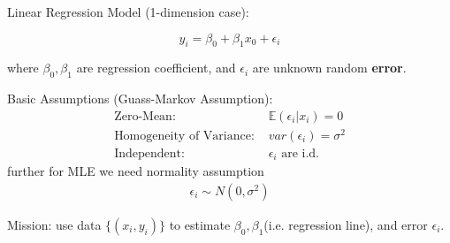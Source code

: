 \begin{point}
    Linear Regression Model (1-dimension case):
\end{point}

    \begin{equation}
        y_i=\beta_0+\beta_1x_0+\epsilon_i    
    \end{equation}

    where $\beta_0,\beta_1$ are regression coefficient, and $\epsilon_i$ are unknown random \textbf{error}. 
    
    Basic Assumptions (Guass-Markov Assumption):
    \begin{align}
        \text{Zero-Mean: }&\mathbb{E}(\epsilon_i|x_i)=0\\
        \text{Homogeneity of Variance: }&var(\epsilon_i)=\sigma^2\\
        \text{Independent: }&\epsilon_i\text{ are i.d.}
    \end{align}
    further for MLE we need normality assumption
    \begin{align*}
        \epsilon_i\sim N(0,\sigma^2)
    \end{align*}
    
    

    Mission: use data $\{(x_i,y_i)\}$ to estimate $\beta_0,\beta_1$(i.e. regression line), and error $\epsilon_i$.

